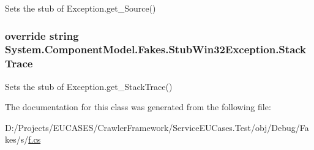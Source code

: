 Sets the stub of Exception.\-get\-\_\-\-Source()

\hypertarget{class_system_1_1_component_model_1_1_fakes_1_1_stub_win32_exception_af5fd4e11b9750f118492b05bec80e7d3}{
\subsubsection[{Stack\-Trace}]{\setlength{\rightskip}{0pt plus 5cm}override string System.\-Component\-Model.\-Fakes.\-Stub\-Win32\-Exception.\-Stack\-Trace\hspace{0.3cm}{\ttfamily [get]}}}\label{class_system_1_1_component_model_1_1_fakes_1_1_stub_win32_exception_af5fd4e11b9750f118492b05bec80e7d3}


Sets the stub of Exception.\-get\-\_\-\-Stack\-Trace()



The documentation for this class was generated from the following file\-:\begin{DoxyCompactItemize}
\item 
D\-:/\-Projects/\-E\-U\-C\-A\-S\-E\-S/\-Crawler\-Framework/\-Service\-E\-U\-Cases.\-Test/obj/\-Debug/\-Fakes/s/\hyperlink{s_2f_8cs}{f.\-cs}\end{DoxyCompactItemize}
